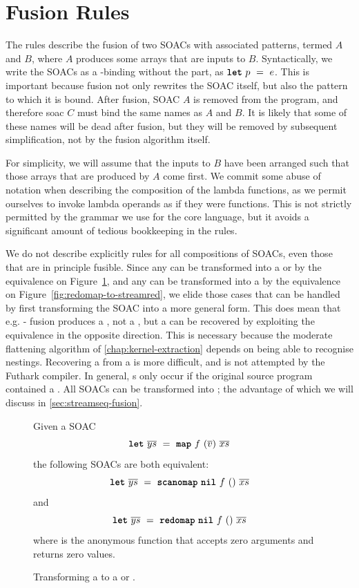 \section{Fusion Rules}
\label{sec:fusionalgebra}

The rules describe the fusion of two SOACs with associated patterns,
termed $A$ and $B$, where $A$ produces some arrays that are inputs to
$B$.  Syntactically, we write the SOACs as a -binding without
the  part, as $\mbox{\texttt{\bfseries{let}}}~p~=~e$.  This is important because
fusion not only rewrites the SOAC itself, but also the pattern to
which it is bound.  After fusion, SOAC $A$ is removed from the
program, and therefore soac $C$ must bind the same names as $A$ and
$B$.  It is likely that some of these names will be dead after fusion,
but they will be removed by subsequent simplification, not by the
fusion algorithm itself.

For simplicity, we will assume that the inputs to $B$ have been
arranged such that those arrays that are produced by $A$ come first.
We commit some abuse of notation when describing the composition of
the lambda functions, as we permit ourselves to invoke lambda operands
as if they were functions.  This is not strictly permitted by the
grammar we use for the core language, but it avoids a significant
amount of tedious bookkeeping in the rules.

We do not describe explicitly rules for all compositions of SOACs,
even those that are in principle fusible.  Since any  can be
transformed into a  or  by the equivalence on
Figure~\ref{fig:map-to-scanomap-or-redomap}, and any  can
be transformed into a \StreamPar by the equivalence on
Figure~\ref{fig:redomap-to-streamred}, we elide those cases that can
be handled by first transforming the SOAC into a more general form.
This does mean that e.g. - fusion produces a
, not a , but a  can be recovered by
exploiting the equivalence in the opposite direction.  This is
necessary because the moderate flattening algorithm of
\cref{chap:kernel-extraction} depends on being able to recognise
 nestings.  Recovering a  from a \StreamPar is
more difficult, and is not attempted by the Futhark compiler.  In
general, \StreamPar{}s only occur if the original source program
contained a \StreamRed{}.  All SOACs can be transformed into
\StreamSeq; the advantage of which we will discuss in
\cref{sec:streamseq-fusion}.

\begin{figure}[bt]
  Given a SOAC
\[
  \mbox{\texttt{\bfseries{let}}}~\overline{ys}~=~\mbox{\texttt{\bfseries{map}}}~f~(\overline{v})~\overline{xs}
\]
the following SOACs are both equivalent:
\[
  \mbox{\texttt{\bfseries{let}}}~\overline{ys}~=~\mbox{\texttt{\bfseries{scanomap}}}~\mbox{\texttt{\bfseries{nil}}}~f~()~\overline{xs}
\]
and
\[
  \mbox{\texttt{\bfseries{let}}}~\overline{ys}~=~\mbox{\texttt{\bfseries{redomap}}}~\mbox{\texttt{\bfseries{nil}}}~f~()~\overline{xs}
\]
where  is the anonymous function that accepts zero arguments
and returns zero values.
  \caption{Transforming a  to a  or .}
  \label{fig:map-to-scanomap-or-redomap}
\end{figure}

